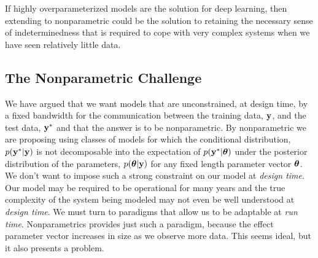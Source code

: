 \documentclass[a4paperpaper,]{article}
\begin{document}
If highly overparameterized models are the solution for deep learning,
then extending to nonparametric could be the solution to retaining the
necessary sense of indeterminedness that is required to cope with very
complex systems when we have seen relatively little data.

\hypertarget{the-nonparametric-challenge}{%
\subsection{The Nonparametric
Challenge}\label{the-nonparametric-challenge}}


We have argued that we want models that are unconstrained, at design
time, by a fixed bandwidth for the communication between the training
data, \(\mathbf{ y}\), and the test data, \(\mathbf{ y}^*\) and that the
answer is to be nonparametric. By nonparametric we are proposing using
classes of models for which the conditional distribution,
\(p(\mathbf{ y}^*|\mathbf{ y})\) is not decomposable into the
expectation of \(p(\mathbf{ y}^*|\boldsymbol{ \theta})\) under the posterior
distribution of the parameters, \(p(\boldsymbol{ \theta}|\mathbf{ y})\) for any
fixed length parameter vector \(\boldsymbol{ \theta}\). We don't want to impose
such a strong constraint on our model at \emph{design time}. Our model
may be required to be operational for many years and the true complexity
of the system being modeled may not even be well understood at
\emph{design time}. We must turn to paradigms that allow us to be
adaptable at \emph{run time}. Nonparametrics provides just such a
paradigm, because the effect parameter vector increases in size as we
observe more data. This seems ideal, but it also presents a problem.
\end{document}
